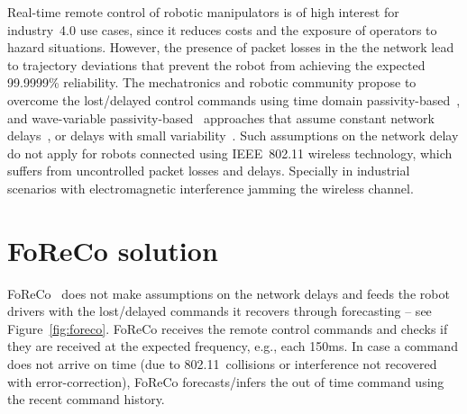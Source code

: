 \documentclass[a0,portrait]{a0poster}
\begin{document}
\begin{multicols}{2}
Real-time remote control of robotic manipulators is
of high interest for industry~4.0 use cases,
since it reduces costs and the exposure of
operators to hazard situations.
However, the presence of packet losses in
the the network lead to trajectory deviations
that prevent the robot from achieving
the expected 99.9999\% reliability.
The mechatronics and robotic community
propose to overcome the lost/delayed 
control commands using time domain
passivity-based~\cite{TDPC-3}, and
wave-variable passivity-based~\cite{wvbc-4}
approaches that assume constant
network delays~\cite{TDPC-5},
or delays with small 
variability~\cite{TDPC-3,wvbc-4}.
Such assumptions on the network delay
do not apply for robots connected using
IEEE~802.11 wireless technology,
which suffers from uncontrolled
packet losses and delays. Specially
in industrial scenarios with electromagnetic
interference jamming the wireless channel.






\color{DarkSlateGray} %



\section*{FoReCo solution}
\label{sec:foreco}

FoReCo~\cite{foreco} does not make assumptions on the network
delays and
feeds the robot drivers with
the lost/delayed commands it recovers through
forecasting -- see Figure~\ref{fig:foreco}.
FoReCo receives the remote
control commands and checks if they
are received at the expected
frequency, e.g., each 150ms.
In case a command does not arrive
on time (due to 802.11~collisions
or interference not recovered
with error-correction),
FoReCo forecasts/infers
the out of time command using the
recent command history.



\end{multicols}
\end{document}
